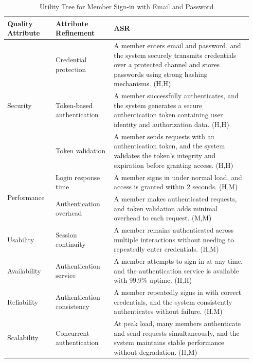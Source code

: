 \documentclass{article}
\begin{document}
\begin{table}[H]
\centering
\caption{Utility Tree for Member Sign-in with Email and Password}
\begin{tabular}{|p{3cm}|p{4cm}|p{7cm}|}
\hline
\textbf{Quality Attribute} & \textbf{Attribute Refinement} & \textbf{ASR} \\
\hline

\multirow{3}{*}{Security}
& Credential protection
& A member enters email and password, and the system securely transmits credentials over a protected channel and stores passwords using strong hashing mechanisms. (H,H) \\
\cline{2-3}
& Token-based authentication
& A member successfully authenticates, and the system generates a secure authentication token containing user identity and authorization data. (H,H) \\
\cline{2-3}
& Token validation
& A member sends requests with an authentication token, and the system validates the token’s integrity and expiration before granting access. (H,H) \\
\hline

\multirow{2}{*}{Performance}
& Login response time
& A member signs in under normal load, and access is granted within 2 seconds. (H,M) \\
\cline{2-3}
& Authentication overhead
& A member makes authenticated requests, and token validation adds minimal overhead to each request. (M,M) \\
\hline

Usability
& Session continuity
& A member remains authenticated across multiple interactions without needing to repeatedly enter credentials. (H,M) \\
\hline

Availability
& Authentication service
& A member attempts to sign in at any time, and the authentication service is available with 99.9\% uptime. (H,H) \\
\hline

Reliability
& Authentication consistency
& A member repeatedly signs in with correct credentials, and the system consistently authenticates without failure. (H,M) \\
\hline

Scalability
& Concurrent authentication
& At peak load, many members authenticate and send requests simultaneously, and the system maintains stable performance without degradation. (H,M) \\
\hline

\end{tabular}
\end{table}
\end{document}
